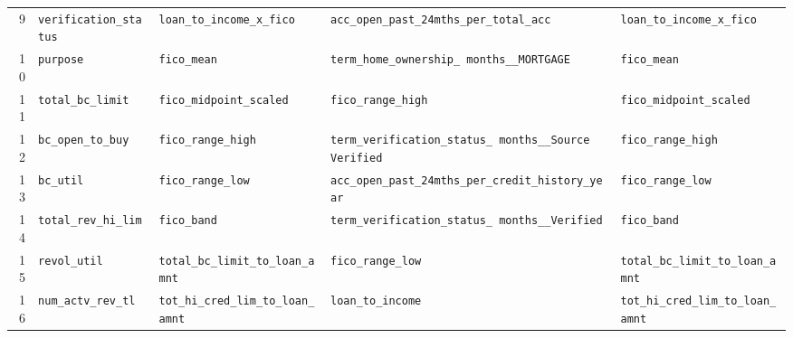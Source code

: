 \documentclass[final,5p,twocolumn]{elsarticle}
\begin{document}
\begin{table}[htbp]
\begin{threeparttable}
\begin{tabular}{@{}rL{40mm}L{40mm}L{40mm}L{40mm}@{}}
9 & \texttt{verification\_\allowbreak status} & \texttt{loan\_\allowbreak to\_\allowbreak income\_\allowbreak x\_\allowbreak fico} & \texttt{acc\_\allowbreak open\_\allowbreak past\_\allowbreak 24mths\_\allowbreak per\_\allowbreak total\_\allowbreak acc} & \texttt{loan\_\allowbreak to\_\allowbreak income\_\allowbreak x\_\allowbreak fico} \\
10 & \texttt{purpose} & \texttt{fico\_\allowbreak mean} & \texttt{term\_\allowbreak home\_\allowbreak ownership\_ months\_\allowbreak \_\allowbreak MORTGAGE} & \texttt{fico\_\allowbreak mean} \\
11 & \texttt{total\_\allowbreak bc\_\allowbreak limit} & \texttt{fico\_\allowbreak midpoint\_\allowbreak scaled} & \texttt{fico\_\allowbreak range\_\allowbreak high} & \texttt{fico\_\allowbreak midpoint\_\allowbreak scaled} \\
12 & \texttt{bc\_\allowbreak open\_\allowbreak to\_\allowbreak buy} & \texttt{fico\_\allowbreak range\_\allowbreak high} & \texttt{term\_\allowbreak verification\_\allowbreak status\_ months\_\allowbreak \_\allowbreak Source Verified} & \texttt{fico\_\allowbreak range\_\allowbreak high} \\
13 & \texttt{bc\_\allowbreak util} & \texttt{fico\_\allowbreak range\_\allowbreak low} & \texttt{acc\_\allowbreak open\_\allowbreak past\_\allowbreak 24mths\_\allowbreak per\_\allowbreak credit\_\allowbreak history\_\allowbreak year} & \texttt{fico\_\allowbreak range\_\allowbreak low} \\
14 & \texttt{total\_\allowbreak rev\_\allowbreak hi\_\allowbreak lim} & \texttt{fico\_\allowbreak band} & \texttt{term\_\allowbreak verification\_\allowbreak status\_ months\_\allowbreak \_\allowbreak Verified} & \texttt{fico\_\allowbreak band} \\
15 & \texttt{revol\_\allowbreak util} & \texttt{total\_\allowbreak bc\_\allowbreak limit\_\allowbreak to\_\allowbreak loan\_\allowbreak amnt} & \texttt{fico\_\allowbreak range\_\allowbreak low} & \texttt{total\_\allowbreak bc\_\allowbreak limit\_\allowbreak to\_\allowbreak loan\_\allowbreak amnt} \\
16 & \texttt{num\_\allowbreak actv\_\allowbreak rev\_\allowbreak tl} & \texttt{tot\_\allowbreak hi\_\allowbreak cred\_\allowbreak lim\_\allowbreak to\_\allowbreak loan\_\allowbreak amnt} & \texttt{loan\_\allowbreak to\_\allowbreak income} & \texttt{tot\_\allowbreak hi\_\allowbreak cred\_\allowbreak lim\_\allowbreak to\_\allowbreak loan\_\allowbreak amnt} \\

\end{tabular}
\end{threeparttable}
\end{table}
\end{document}
